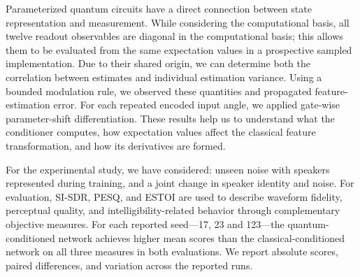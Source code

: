 \documentclass[10pt,a4paper]{article}
\begin{document}
Parameterized quantum circuits have a direct connection between state representation and measurement. While considering the computational basis, all twelve readout observables are diagonal in the computational basis; this allows them to be evaluated from the same expectation values in a prospective sampled implementation. Due to their shared origin, we can determine both the correlation between estimates and individual estimation variance. Using a bounded modulation rule, we observed these quantities and propagated feature-estimation error. For each repeated encoded input angle, we applied gate-wise parameter-shift differentiation. These results help us to understand what the conditioner computes, how expectation values affect the classical feature transformation, and how its derivatives are formed.



For the experimental study, we have considered: unseen noise with speakers represented during training, and a joint change in speaker identity and noise. For evaluation, SI-SDR, PESQ, and ESTOI are used to describe waveform fidelity, perceptual quality, and intelligibility-related behavior through complementary objective measures. For each reported seed---17, 23 and 123---the quantum-conditioned network achieves higher mean scores than the classical-conditioned network on all three measures in both evaluations. We report absolute scores, paired differences, and variation across the reported runs.
\end{document}
